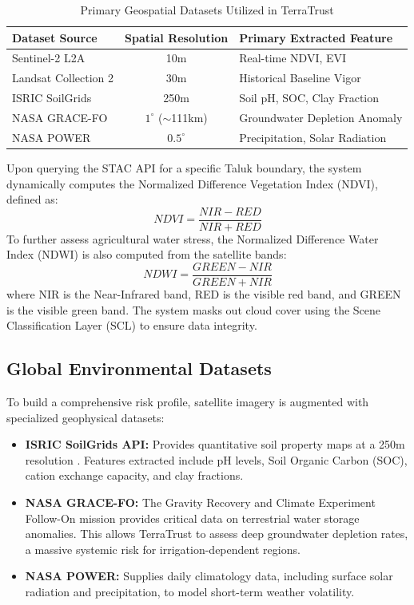 \documentclass[conference]{IEEEtran}
\begin{document}
\begin{table}[htbp]
\caption{Primary Geospatial Datasets Utilized in TerraTrust}
\begin{center}
\begin{tabular}{|l|c|l|}
\hline
\textbf{Dataset Source} & \textbf{Spatial Resolution} & \textbf{Primary Extracted Feature} \\
\hline
Sentinel-2 L2A & 10m & Real-time NDVI, EVI \\
\hline
Landsat Collection 2 & 30m & Historical Baseline Vigor \\
\hline
ISRIC SoilGrids & 250m & Soil pH, SOC, Clay Fraction \\
\hline
NASA GRACE-FO & $1^\circ$ ($\sim$111km) & Groundwater Depletion Anomaly \\
\hline
NASA POWER & $0.5^\circ$ & Precipitation, Solar Radiation \\
\hline
\end{tabular}
\label{tab:datasets}
\end{center}
\end{table}

Upon querying the STAC API for a specific Taluk boundary, the system dynamically computes the Normalized Difference Vegetation Index (NDVI), defined as:
\begin{equation}
    NDVI = \frac{NIR - RED}{NIR + RED}
\end{equation}
To further assess agricultural water stress, the Normalized Difference Water Index (NDWI) is also computed from the satellite bands:
\begin{equation}
    NDWI = \frac{GREEN - NIR}{GREEN + NIR}
\end{equation}
where NIR is the Near-Infrared band, RED is the visible red band, and GREEN is the visible green band. The system masks out cloud cover using the Scene Classification Layer (SCL) to ensure data integrity.

\subsection{Global Environmental Datasets}
To build a comprehensive risk profile, satellite imagery is augmented with specialized geophysical datasets:
\begin{itemize}
    \item \textbf{ISRIC SoilGrids API:} Provides quantitative soil property maps at a 250m resolution \cite{b5}. Features extracted include pH levels, Soil Organic Carbon (SOC), cation exchange capacity, and clay fractions.
    \item \textbf{NASA GRACE-FO:} The Gravity Recovery and Climate Experiment Follow-On mission provides critical data on terrestrial water storage anomalies. This allows TerraTrust to assess deep groundwater depletion rates, a massive systemic risk for irrigation-dependent regions.
    \item \textbf{NASA POWER:} Supplies daily climatology data, including surface solar radiation and precipitation, to model short-term weather volatility.
\end{itemize}
\end{document}
